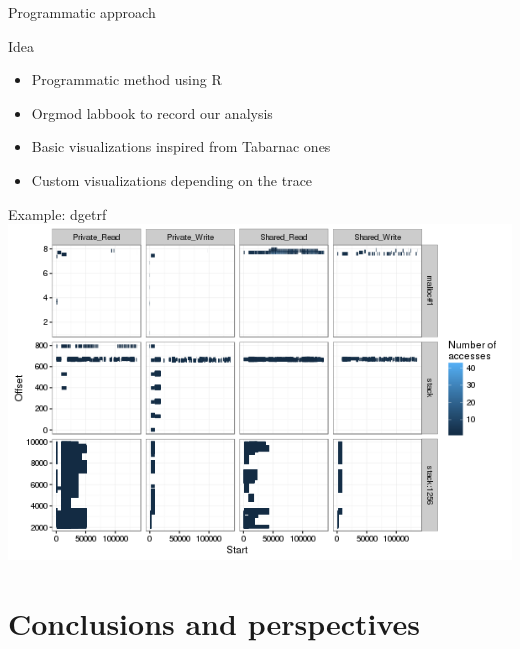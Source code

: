 \documentclass[xcolor={usenames,dvipsnames},hyperref={pdfusetitle}]{beamer}
\begin{document}
\begin{frame}{Programmatic approach}
    \begin{block}{Idea}
        \begin{itemize}
            \item Programmatic method using R
            \item Orgmod labbook to record our analysis
            \item Basic visualizations inspired from Tabarnac ones
            \item Custom visualizations depending on the trace
        \end{itemize}
    \end{block}
\end{frame}

\begin{frame}{Example: dgetrf}
    \centering
    \includegraphics[width=\linewidth]{labbook/intensity_RW_dgetrf_zoom}
\end{frame}

\section{Conclusions and perspectives}
\end{document}
